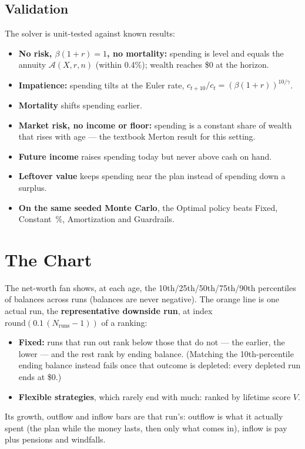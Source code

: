 \documentclass[11pt,letterpaper]{article}
\begin{document}
\subsection{Validation}
The solver is unit-tested against known results:
\begin{itemize}
\setlength\itemsep{1pt}
\item \textbf{No risk, $\beta(1+r)=1$, no mortality:} spending is level and equals the annuity $\mathcal{A}(X, r, n)$ (within 0.4\%); wealth reaches \$0 at the horizon.
\item \textbf{Impatience:} spending tilts at the Euler rate, $c_{t+10}/c_t = (\beta(1+r))^{10/\gamma}$.
\item \textbf{Mortality} shifts spending earlier.
\item \textbf{Market risk, no income or floor:} spending is a constant share of wealth that rises with age --- the textbook Merton result for this setting.
\item \textbf{Future income} raises spending today but never above cash on hand.
\item \textbf{Leftover value} keeps spending near the plan instead of spending down a surplus.
\item \textbf{On the same seeded Monte Carlo}, the Optimal policy beats Fixed, Constant~\%, Amortization and Guardrails.
\end{itemize}

\section{The Chart}

The net-worth fan shows, at each age, the 10th/25th/50th/75th/90th percentiles of balances across runs (balances are never negative). The orange line is one actual run, the \textbf{representative downside run}, at index $\mathrm{round}(0.1\,(N_{\text{runs}}-1))$ of a ranking:
\begin{itemize}
\setlength\itemsep{1pt}
\item \textbf{Fixed:} runs that run out rank below those that do not --- the earlier, the lower --- and the rest rank by ending balance. (Matching the 10th-percentile ending balance instead fails once that outcome is depleted: every depleted run ends at \$0.)
\item \textbf{Flexible strategies}, which rarely end with much: ranked by lifetime score $V$.
\end{itemize}
Its growth, outflow and inflow bars are that run's: outflow is what it actually spent (the plan while the money lasts, then only what comes in), inflow is pay plus pensions and windfalls.
\end{document}

